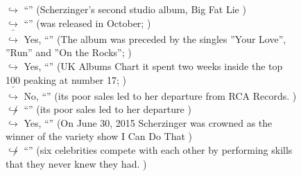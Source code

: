 \documentclass[11pt,a4paper, onecolumn]{article}
\begin{document}
\begin{figure}[t] \small \begin{tcolorbox}[boxsep=0pt,left=5pt,right=0pt,top=2pt,colback = yellow!5] \begin{dialogue}
 \small 
\colorbox{pink!25}{$\hookrightarrow$}
{ ``'' (Scherzinger's second studio album, Big Fat Lie ) }
\\
\colorbox{pink!25}{$\hookrightarrow$}
{ ``'' (was released in October; ) }
\\
\colorbox{pink!25}{ $\bar{\hookrightarrow}$}
\colorbox{red!25}{Yes,}
{ ``'' (The album was preceded by the singles ''Your Love'', ''Run'' and ''On the Rocks''; ) }
\\
\colorbox{pink!25}{$\hookrightarrow$}
\colorbox{red!25}{Yes,}
{ ``'' (UK Albums Chart it spent two weeks inside the top 100 peaking at number 17; ) }
\\
\colorbox{pink!25}{ $\bar{\hookrightarrow}$}
\colorbox{red!25}{No,}
{ ``'' (its poor sales led to her departure from RCA Records. ) }
\\
\colorbox{pink!25}{$\not\hookrightarrow$}
{ ``'' (its poor sales led to her departure ) }
\\
\colorbox{pink!25}{$\hookrightarrow$}
\colorbox{red!25}{Yes,}
{ ``'' (On June 30, 2015 Scherzinger was crowned as the winner of the variety show I Can Do That ) }
\\
\colorbox{pink!25}{$\not\hookrightarrow$}
{ ``'' (six celebrities compete with each other by performing skills that they never knew they had. ) }
\\
 \end{dialogue}\end{tcolorbox}\end{figure}
\end{document}
